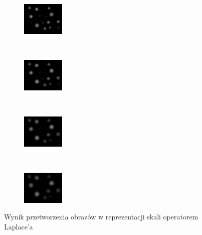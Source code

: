 \begin{frame}
\begin{figure}[h]
\begin{center}
\begin{subfigure}[b]{2cm}
\centering
\includegraphics[width=2cm]{circles4.jpg}
\end{subfigure}~
\begin{subfigure}[b]{2cm}
\centering
\includegraphics[width=2cm]{circles5.jpg}
\end{subfigure}~
\begin{subfigure}[b]{2cm}
\centering
\includegraphics[width=2cm]{circles6.jpg}
\end{subfigure}~
\begin{subfigure}[b]{2cm}
\centering
\includegraphics[width=2cm]{circles7.jpg}
\end{subfigure}
\caption{Wynik przetworzenia obrazów w reprezentacji skali operatorem Laplace'a}
\label{circles}
\end{center}
\end{figure}

\end{frame}

